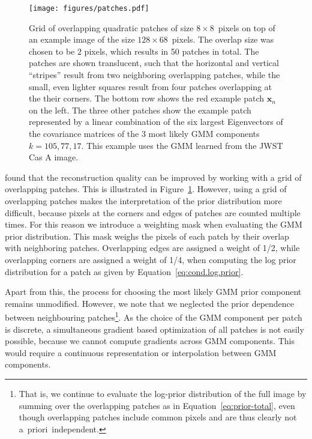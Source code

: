 \documentclass[twocolumn, lineno]{aastex631}
\newcommand{\aprioir}{a~priori~}
\begin{document}
 \begin{figure}
        \begin{centering}
            \texttt{[image: figures/patches.pdf]}
            \caption{
                Grid of overlapping quadratic patches of size $8\times8$~pixels on top of an example image of the size $128 \times 68$~pixels. The overlap size was chosen to be $2$ pixels, which results in 50 patches in total. The patches are shown translucent, such that the horizontal and vertical \enquote{stripes} result from two neighboring overlapping patches, while the small, even lighter squares result from four patches overlapping at the their corners. The bottom row shows the red example patch $\mathbf{x}_n$ on the left. The three other patches show the example patch represented by a linear combination of the six largest Eigenvectors of the covariance matrices of the 3 most likely GMM components $k = 105, 77, 17$. This example uses the GMM learned from the JWST Cas A image.
            }
            \label{fig:patches}
        \end{centering}
    \end{figure}


    \cite{Zoran2011} found that the reconstruction quality can be improved by working with a grid of overlapping patches. This is illustrated in Figure~\ref{fig:patches}. However, using a grid of overlapping patches makes the interpretation of the prior distribution more difficult, because pixels at the corners and edges of patches are counted multiple times. For this reason we introduce a weighting mask when evaluating the GMM prior distribution. This mask weighs the pixels of each patch by their overlap with neighboring patches. Overlapping edges are assigned a weight of 1/2, while overlapping corners are assigned a weight of 1/4, when computing the log prior distribution for a patch as given by Equation~\ref{eq:cond.log.prior}.
    
    Apart from this, the process for choosing the most likely GMM prior component remains unmodified. However, we note that we neglected the prior dependence between neighbouring patches\footnote{That is, we continue to evaluate the log-prior distribution of the full image by summing over the overlapping patches as in Equation~\ref{eq:prior-total}, even though overlapping patches include common pixels and are thus clearly not \aprioir independent.}. As the choice of the GMM component per patch is discrete, a simultaneous gradient based optimization of all patches is not easily possible, because we cannot compute gradients across GMM components. This would require a continuous representation or interpolation between GMM components.
   
\end{document}
